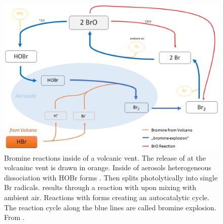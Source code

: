 \documentclass  [
  paper    = a4,
  BCOR     = 10mm,
  twoside,
  fontsize = 12pt,
  fleqn,
  toc      = bibnumbered,
  toc      = listofnumbered,
  numbers  = noendperiod,
  headings = normal,
  listof   = leveldown,
  version  = 3.03
]                                       {scrreprt}
\begin{document}
\begin{figure}
	\centering
	\includegraphics[width=0.7\linewidth]{Bilder/Simon/Bilder_Tung/BrO_Explosion}
	\caption[Bromine reactions inside of a volcanic vent. From \citet{WarnachSimon}.]{Bromine reactions inside of a volcanic vent. The release of  at the volcaninc vent is drawn  in orange. Inside of aerosols heterogeneous dissociation with HOBr forms . Then  splits photolytically into single Br radicals.   results through a reaction with  upon mixing with ambient air. Reactions with    forms  creating an autocatalytic cycle. The reaction cycle along the blue lines are called bromine explosion. From \citet{WarnachSimon}.}
	\label{fig:broexplosion}
\end{figure}
%
\end{document}
